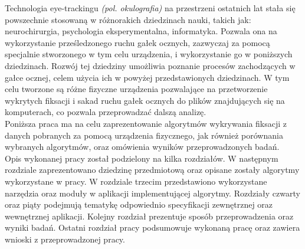 Technologia eye-trackingu \textit{(pol. okulografia)} na przestrzeni ostatnich lat stała się powszechnie stosowaną w różnorakich dziedzinach nauki, takich jak: neurochirurgia, psychologia eksperymentalna, informatyka. Pozwala ona na wykorzystanie prześledzonego ruchu gałek ocznych, zazwyczaj za pomocą specjalnie stworzonego w tym celu urządzenia, i wykorzystanie go w poniższych dziedzinach. Rozwój tej dziedziny umożliwia poznanie procesów zachodzących w gałce ocznej, celem użycia ich w powyżej przedstawionych dziedzinach. W tym celu tworzone są różne fizyczne urządzenia pozwalające na przetworzenie wykrytych fiksacji i sakad ruchu gałek ocznych do plików znajdujących się na komputerach, co pozwala przeprowadzać dalszą analizę.
\\[\baselineskip]
Poniższa praca ma na celu zaprezentowanie algorytmów wykrywania fiksacji z danych pobranych za pomocą urządzenia fizycznego, jak również porównania wybranych algorytmów, oraz omówienia wyników przeprowadzonych badań.\\[\baselineskip]
Opis wykonanej pracy został podzielony na kilka rozdziałów. W następnym rozdziale zaprezentowano dziedzinę przedmiotową oraz opisane zostały algorytmy wykorzystane w pracy. W rozdziale trzecim przedstawiono wykorzystane narzędzia oraz moduły w aplikacji implementującej algorytmy. Rozdziały czwarty oraz piąty podejmują tematykę odpowiednio specyfikacji zewnętrznej oraz wewnętrznej aplikacji. Kolejny rozdział prezentuje sposób przeprowadzenia oraz wyniki badań. Ostatni rozdział pracy podsumowuje wykonaną pracę oraz zawiera wnioski z przeprowadzonej pracy.